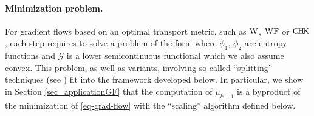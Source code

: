 \paragraph{Minimization problem.}
For gradient flows based on an optimal transport metric, such as $\operatorname{W}$, $\operatorname{WF}$ or $\operatorname{G\! H\! K}$, each step requires to solve a problem of the form
where $\phi_1$, $\phi_2$ are entropy functions and $\mathcal{G}$ is a lower semicontinuous functional which we also assume convex.
This problem, as well as variants, involving so-called ``splitting'' techniques (see \cite{GallouetMonsaingeon2015}) fit into the framework developed below. In particular, we show in Section \ref{sec_applicationGF} that the computation of $\mu_{k+1}$ is a byproduct of the minimization of \eqref{eq-grad-flow} with the ``scaling'' algorithm defined below.

